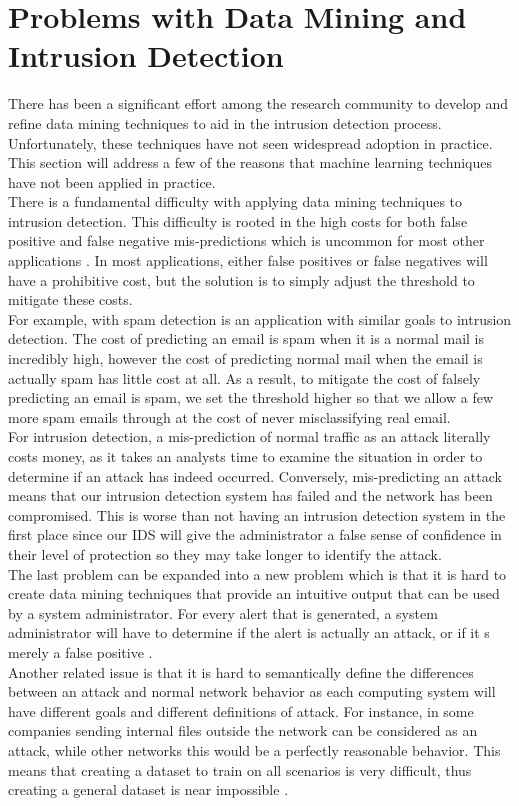 \documentclass[12pt]{article} %
\begin{document}
\section{Problems with Data Mining and Intrusion Detection}
There has been a significant effort among the research community to develop and refine data mining techniques to aid in the intrusion detection process. Unfortunately, these techniques have not seen widespread adoption in practice. This section will address a few of the reasons that machine learning techniques have not been applied in practice.\\
There is a fundamental difficulty with applying data mining techniques to intrusion detection. This difficulty is rooted in the high costs for both false positive and false negative mis-predictions which is uncommon for most other applications \cite{paxon10}. In most applications, either false positives or false negatives will have a prohibitive cost, but the solution is to simply adjust the threshold to mitigate these costs.\\
For example, with spam detection is an application with similar goals to intrusion detection. The cost of predicting an email is spam when it is a normal mail is incredibly high, however the cost of predicting normal mail when the email is actually spam has little cost at all. As a result, to mitigate the cost of falsely predicting an email is spam, we set the threshold higher so that we allow a few more spam emails through at the cost of never misclassifying real email.\\
For intrusion detection, a mis-prediction of normal traffic as an attack literally costs money, as it takes an analysts time to examine the situation in order to determine if an attack has indeed occurred. Conversely, mis-predicting an attack means that our intrusion detection system has failed and the network has been compromised. This is worse than not having an intrusion detection system in the first place since our IDS will give the administrator a false sense of confidence in their level of protection so they may take longer to identify the attack.\\
The last problem can be expanded into a new problem which is that it is hard to create data mining techniques that provide an intuitive output that can be used by a system administrator. For every alert that is generated, a system administrator will have to determine if the alert is actually an attack, or if it s merely a false positive \cite{paxon10}.\\
Another related issue is that it is hard to semantically define the differences between an attack and normal network behavior as each computing system will have different goals and different definitions of attack. For instance, in some companies sending internal files outside the network can be considered as an attack, while other networks this would be a perfectly reasonable behavior. This means that creating a dataset to train on all scenarios is very difficult, thus creating a general dataset is near impossible \cite{paxon10}.\\
\end{document}
